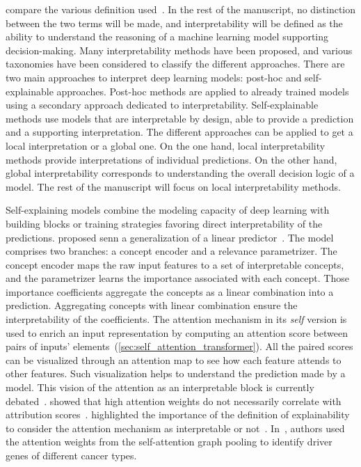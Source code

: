 \documentclass[../main.tex]{subfiles}
\begin{document}
	\citeauthor{clinciu-hastie-2019-survey} compare the various definition used~\cite{clinciu-hastie-2019-survey}.
	In the rest of the manuscript, no distinction between the two terms will be made, and interpretability will be defined as the ability to understand the reasoning of a machine learning model supporting decision-making.
	Many interpretability methods have been proposed, and various taxonomies have been considered to classify the different approaches.
	There are two main approaches to interpret deep learning models: post-hoc and self-explainable approaches.
	Post-hoc methods are applied to already trained models using a secondary approach dedicated to interpretability.
	Self-explainable methods use models that are interpretable by design, \ie{}able to provide a prediction and a supporting interpretation.
	The different approaches can be applied to get a local interpretation or a global one.
	On the one hand, local interpretability methods provide interpretations of individual predictions.
	On the other hand, global interpretability corresponds to understanding the overall decision logic of a model.
	The rest of the manuscript will focus on local interpretability methods.

	Self-explaining models combine the modeling capacity of deep learning with building blocks or training strategies favoring direct interpretability of the predictions.
	\citeauthor{SENN} proposed \gls{senn} a generalization of a linear predictor~\cite{SENN}.
	The model comprises two branches: a concept encoder and a relevance parametrizer.
	The concept encoder maps the raw input features to a set of interpretable concepts, and the parametrizer learns the importance associated with each concept.
	Those importance coefficients aggregate the concepts as a linear combination into a prediction.
	Aggregating concepts with linear combination ensure the interpretability of the coefficients.
	The attention mechanism in its \emph{self} version is used to enrich an input representation by computing an attention score between pairs of inputs' elements~(\cref{sec:self_attention_transformer}).
	All the paired scores can be visualized through an attention map to see how each feature attends to other features.
	Such visualization helps to understand the prediction made by a model.
	This vision of the attention as an interpretable block is currently debated~\cite{jain-wallace-2019-attention,wiegreffe-pinter-2019-attention}.
	\citeauthor{jain-wallace-2019-attention} showed that high attention weights do not necessarily correlate with attribution scores~\cite{jain-wallace-2019-attention}.
	\citeauthor{wiegreffe-pinter-2019-attention} highlighted the importance of the definition of explainability to consider the attention mechanism as interpretable or not~\cite{wiegreffe-pinter-2019-attention}.
	In~\cite{DeepMOCCA}, authors used the attention weights from the self-attention graph pooling to identify driver genes of different cancer types.
\end{document}
